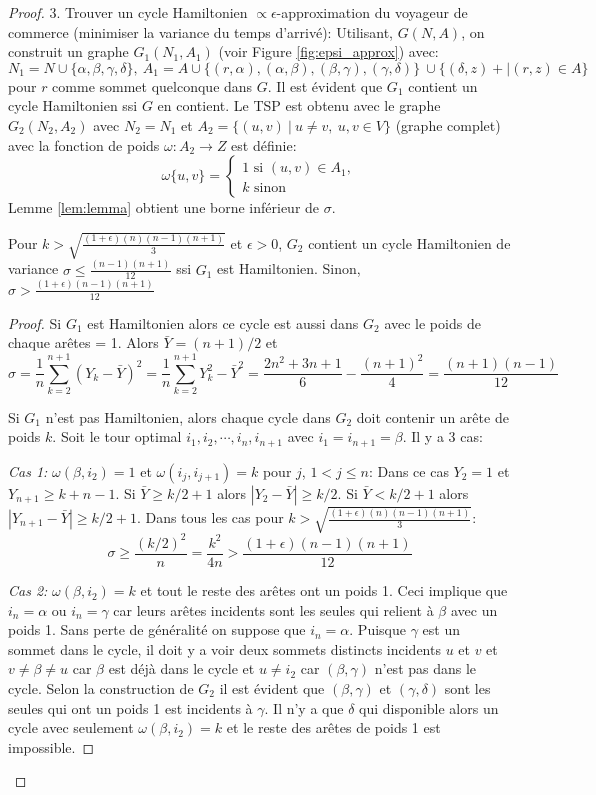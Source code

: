 \documentclass[../main.tex]{subfiles}
\begin{document}
\begin{proof}
3. Trouver un cycle Hamiltonien $\propto \! \epsilon$-approximation du voyageur de commerce (minimiser la variance du temps d'arrivé): Utilisant, $G(N,A)$, on construit un graphe $G_1(N_1, A_1)$ (voir Figure \ref{fig:epsi_approx}) avec:
\[
N_1 = N \cup \{\alpha, \beta, \gamma, \delta \}, \ A_1 = A \cup \{(r, \alpha),(\alpha, \beta),(\beta, \gamma),(\gamma, \delta)\} \ \cup  \{(\delta, z) +| (r,z)\in A\}
\]
pour $r$ comme sommet quelconque dans $G$. Il est évident que $G_1$ contient un cycle Hamiltonien ssi $G$ en contient. Le TSP est obtenu avec le graphe $G_2(N_2, A_2)$ avec $N_2 = N_1$ et $A_2 = \{(u,v)\ |\ u \neq v,\ u,v \in V\}$ (graphe complet) avec la fonction de poids $\omega : A_2 \rightarrow Z$ est définie:
\[
\omega \{u, v\} = \begin{cases}
\text{1 si } (u,v)\in A_1,\\
k \text{ sinon}
\end{cases}
\]
Lemme \ref{lem:lemma} obtient une borne inférieur de $\sigma$.
\begin{lemma}
\label{lem:lemma}
Pour $k > \sqrt{\frac{(1+\epsilon)(n)(n-1)(n+1)}{3}}$ et $\epsilon >0$, $G_2$ contient un cycle Hamiltonien de variance $\sigma \leq \frac{(n-1)(n+1)}{12}$ ssi $G_1$ est Hamiltonien. Sinon, $\sigma > \frac{(1+\epsilon)(n-1)(n+1)}{12}$
\end{lemma}
\begin{proof}
Si $G_1$ est Hamiltonien alors ce cycle est aussi dans $G_2$ avec le poids de chaque arêtes = 1. Alors $\bar{Y} = (n+1)/2$ et
\[
\sigma = \frac{1}{n}\sum_{k = 2}^{n+1} (Y_k - \bar{Y})^2 = \frac{1}{n}\sum_{k = 2}^{n+1} Y_k^2 - \bar{Y}^2 = \frac{2n^2+3n+1}{6} - \frac{(n+1)^2}{4} = \frac{(n+1)(n-1)}{12}
\]

Si $G_1$ n'est pas Hamiltonien, alors chaque cycle dans $G_2$ doit contenir un arête de poids $k$. Soit le tour optimal $i_1,i_2,\cdots , i_n,i_{n+1}$ avec $i_1=i_{n+1}=\beta$. Il y a 3 cas:

\emph{Cas 1:} $\omega (\beta, i_2) = 1$ et $\omega (i_j, i_{j+1})=k$ pour $j$, $1 < j \leq n$: Dans ce cas $Y_2=1$ et $Y_{n+1} \geq k+n-1$. Si $\bar{Y} \geq k/2+1$ alors $|Y_2 - \bar{Y}| \geq k/2$. Si $\bar{Y} < k/2+1$ alors $|Y_{n+1} - \bar{Y}| \geq k/2 + 1$. Dans tous les cas pour $k > \sqrt{\frac{(1+\epsilon)(n)(n-1)(n+1)}{3}}$:
\[
\sigma \geq \frac{(k/2)^2}{n} = \frac{k^2}{4n} > \frac{(1+\epsilon)(n-1)(n+1)}{12}
\]

\emph{Cas 2:} $\omega (\beta, i_2) = k$ et tout le reste des arêtes ont un poids 1. Ceci implique que $i_n=\alpha$ ou $i_n=\gamma$ car leurs arêtes incidents sont les seules qui relient à $\beta$ avec un poids 1. Sans perte de généralité on suppose que $i_n=\alpha$. Puisque $\gamma$ est un sommet dans le cycle, il doit y a voir deux sommets distincts incidents $u$ et $v$ et $v \neq \beta \neq u$ car $\beta$ est déjà dans le cycle et $u \neq i_2$ car $(\beta, \gamma)$ n'est pas dans le cycle. Selon la construction de $G_2$ il est évident que $(\beta, \gamma)$ et $(\gamma, \delta)$ sont les seules qui ont un poids 1 est incidents à $\gamma$. Il n'y a que $\delta$ qui disponible alors un cycle avec seulement $\omega (\beta, i_2) = k$ et le reste des arêtes de poids 1 est impossible.


\end{proof}
\end{proof}
\end{document}
